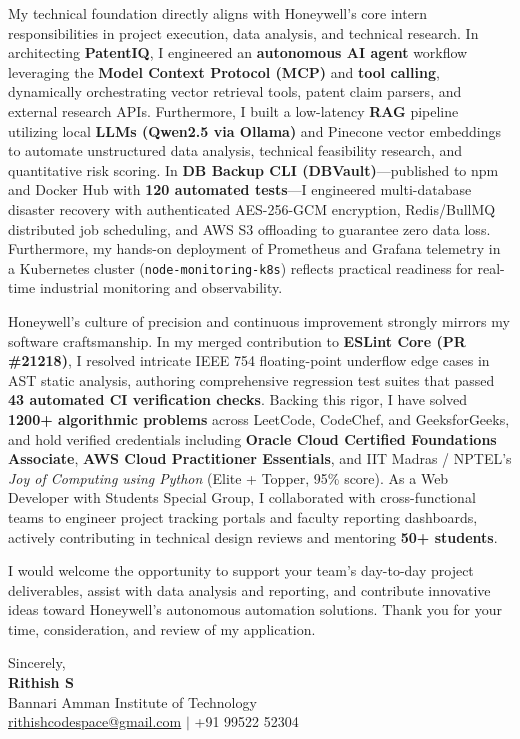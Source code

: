 \documentclass[letterpaper,11pt]{article}
\begin{document}
My technical foundation directly aligns with Honeywell's core intern responsibilities in project execution, data analysis, and technical research. In architecting \textbf{PatentIQ}, I engineered an \textbf{autonomous AI agent} workflow leveraging the \textbf{Model Context Protocol (MCP)} and \textbf{tool calling}, dynamically orchestrating vector retrieval tools, patent claim parsers, and external research APIs. Furthermore, I built a low-latency \textbf{RAG} pipeline utilizing local \textbf{LLMs (Qwen2.5 via Ollama)} and Pinecone vector embeddings to automate unstructured data analysis, technical feasibility research, and quantitative risk scoring. In \textbf{DB Backup CLI (DBVault)}---published to npm and Docker Hub with \textbf{120 automated tests}---I engineered multi-database disaster recovery with authenticated AES-256-GCM encryption, Redis/BullMQ distributed job scheduling, and AWS S3 offloading to guarantee zero data loss. Furthermore, my hands-on deployment of Prometheus and Grafana telemetry in a Kubernetes cluster (\texttt{node-monitoring-k8s}) reflects practical readiness for real-time industrial monitoring and observability.

Honeywell's culture of precision and continuous improvement strongly mirrors my software craftsmanship. In my merged contribution to \textbf{ESLint Core (PR \#21218)}, I resolved intricate IEEE 754 floating-point underflow edge cases in AST static analysis, authoring comprehensive regression test suites that passed \textbf{43 automated CI verification checks}. Backing this rigor, I have solved \textbf{1200+ algorithmic problems} across LeetCode, CodeChef, and GeeksforGeeks, and hold verified credentials including \textbf{Oracle Cloud Certified Foundations Associate}, \textbf{AWS Cloud Practitioner Essentials}, and IIT Madras / NPTEL's \textit{Joy of Computing using Python} (Elite + Topper, 95\% score). As a Web Developer with Students Special Group, I collaborated with cross-functional teams to engineer project tracking portals and faculty reporting dashboards, actively contributing in technical design reviews and mentoring \textbf{50+ students}.

I would welcome the opportunity to support your team's day-to-day project deliverables, assist with data analysis and reporting, and contribute innovative ideas toward Honeywell's autonomous automation solutions. Thank you for your time, consideration, and review of my application.

\vspace{12pt}
Sincerely, \\ \vspace{2pt}
\textbf{Rithish S} \\
\small Bannari Amman Institute of Technology \\
\small \href{mailto:rithishcodespace@gmail.com}{rithishcodespace@gmail.com} $|$ +91 99522 52304
\end{document}
